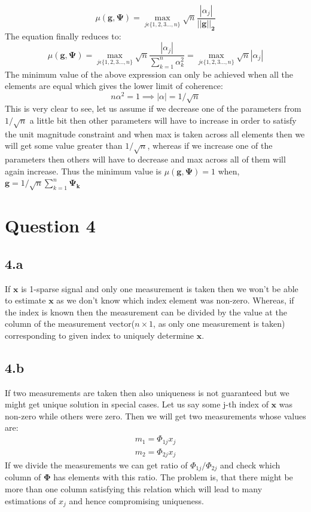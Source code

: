 \documentclass[12pt]{article}
\begin{document}
\begin{equation*}
    \mu(\boldsymbol{g}, \boldsymbol{\Psi}) =  \max_{j \epsilon \{1,2,3...,n\}}\sqrt{n}\frac{|\alpha_j|}{||\boldsymbol{g||_2}}
\end{equation*}
The equation finally reduces to:
\begin{equation*}
    \mu(\boldsymbol{g}, \boldsymbol{\Psi}) =  \max_{j \epsilon \{1,2,3...,n\}}\sqrt{n}\frac{|\alpha_j|}{\sum_{k=1}^{n}\alpha_k^2} = \max_{j \epsilon \{1,2,3...,n\}}\sqrt{n}|\alpha_j|
\end{equation*}
The minimum value of the above expression can only be achieved when all the elements are equal which gives the lower limit of coherence:
\begin{equation*}
    n\alpha^2 = 1 \implies |\alpha| = 1/\sqrt{n}
\end{equation*}
This is very clear to see, let us assume if we decrease one of the parameters from $1/\sqrt{n}$ a little bit then other parameters will have to increase in order to satisfy the unit magnitude constraint and when max is taken across all elements then we will get some value greater than $1/\sqrt{n}$, whereas if we increase one of the parameters then others will have to decrease and max across all of them will again increase. Thus the minimum value is $\mu(\boldsymbol{g}, \boldsymbol{\Psi}) = 1$ when, $\boldsymbol{g} = 1/\sqrt{n}\sum_{k=1}^{n}\boldsymbol{\Psi_k}$

\section*{Question 4}
\subsection*{4.a}
If $\boldsymbol{x}$ is 1-sparse signal and only one measurement is taken then we won't be able to estimate $\boldsymbol{x}$ as we don't know which index element was non-zero. Whereas, if the index is known then the measurement can be divided by the value at the column of the measurement vector($n\times1$, as only one measurement is taken) corresponding to given index to uniquely determine $\boldsymbol{x}$.
\subsection*{4.b}
If two measurements are taken then also uniqueness is not guaranteed but we might get unique solution in special cases. Let us say some j-th index of $\boldsymbol{x}$ was non-zero while others were zero. Then we will get two measurements whose values are:
\begin{align*}
    m_1 = \Phi_{1j}x_j\\
    m_2 = \Phi_{2j}x_j
\end{align*}
If we divide the measurements we can get ratio of $\Phi_{1j}/\Phi_{2j}$ and check which column of $\boldsymbol{\Phi}$ has elements with this ratio. The problem is, that there might be more than one column satisfying this relation which will lead to many estimations of $x_j$ and hence compromising uniqueness.
\end{document}
